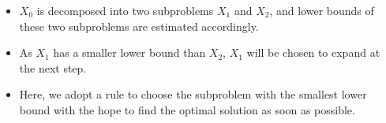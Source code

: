 \documentclass[mathserif]{beamer}
\begin{document}
{\begin{figure}
\end{figure}

\begin{itemize}
	\item $X_0$ is decomposed into two subproblems $X_1$ and $X_2$, and lower bounds of these two subproblems are estimated accordingly. 
	\item As $X_1$ has a smaller lower bound than $X_2$, $X_1$ will be chosen to expand at the next step.  
	\item Here, we adopt a rule to choose the subproblem with the smallest lower bound with the hope to find the optimal solution as soon as possible. 
\end{itemize}

}
\end{document}
